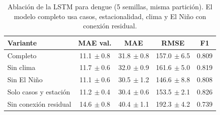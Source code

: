 \begin{table}[t]\centering\caption{Ablación de la LSTM para dengue (5 semillas, misma partición). El modelo completo usa casos, estacionalidad, clima y El Niño con conexión residual.}\label{tab:ablacion}
\setlength{\tabcolsep}{3pt}\footnotesize\begin{tabular}{lcccc}\toprule
Variante & MAE val. & MAE & RMSE & F1 \\\midrule
Completo & 11.1{\tiny$\,\pm$0.8} & 31.8{\tiny$\,\pm$0.8} & 157.0{\tiny$\,\pm$6.5} & 0.809 \\
Sin clima & 11.7{\tiny$\,\pm$0.6} & 32.0{\tiny$\,\pm$0.9} & 161.6{\tiny$\,\pm$5.0} & 0.819 \\
Sin El Niño & 11.1{\tiny$\,\pm$0.6} & 30.5{\tiny$\,\pm$1.2} & 146.6{\tiny$\,\pm$8.8} & 0.808 \\
Solo casos y estación & 11.2{\tiny$\,\pm$0.4} & 30.4{\tiny$\,\pm$0.6} & 153.5{\tiny$\,\pm$2.1} & 0.826 \\
Sin conexión residual & 14.6{\tiny$\,\pm$0.8} & 40.4{\tiny$\,\pm$1.1} & 192.3{\tiny$\,\pm$4.2} & 0.739 \\
\bottomrule\end{tabular}\end{table}
